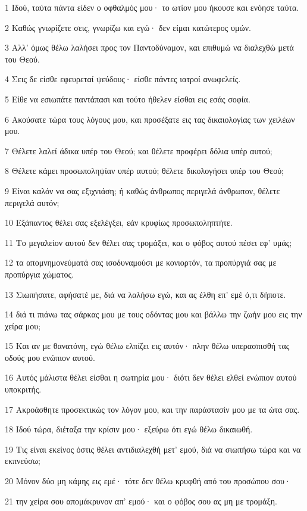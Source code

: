 \par 1 Ιδού, ταύτα πάντα είδεν ο οφθαλμός μου· το ωτίον μου ήκουσε και ενόησε ταύτα.
\par 2 Καθώς γνωρίζετε σεις, γνωρίζω και εγώ· δεν είμαι κατώτερος υμών.
\par 3 Αλλ' όμως θέλω λαλήσει προς τον Παντοδύναμον, και επιθυμώ να διαλεχθώ μετά του Θεού.
\par 4 Σεις δε είσθε εφευρεταί ψεύδους· είσθε πάντες ιατροί ανωφελείς.
\par 5 Είθε να εσιωπάτε παντάπασι και τούτο ήθελεν είσθαι εις εσάς σοφία.
\par 6 Ακούσατε τώρα τους λόγους μου, και προσέξατε εις τας δικαιολογίας των χειλέων μου.
\par 7 Θέλετε λαλεί άδικα υπέρ του Θεού; και θέλετε προφέρει δόλια υπέρ αυτού;
\par 8 Θέλετε κάμει προσωποληψίαν υπέρ αυτού; θέλετε δικολογήσει υπέρ του Θεού;
\par 9 Είναι καλόν να σας εξιχνιάση; ή καθώς άνθρωπος περιγελά άνθρωπον, θέλετε περιγελά αυτόν;
\par 10 Εξάπαντος θέλει σας εξελέγξει, εάν κρυφίως προσωποληπτήτε.
\par 11 Το μεγαλείον αυτού δεν θέλει σας τρομάξει, και ο φόβος αυτού πέσει εφ' υμάς;
\par 12 τα απομνημονεύματά σας ισοδυναμούσι με κονιορτόν, τα προπύργιά σας με προπύργια χώματος.
\par 13 Σιωπήσατε, αφήσατέ με, διά να λαλήσω εγώ, και ας έλθη επ' εμέ ό,τι δήποτε.
\par 14 διά τι πιάνω τας σάρκας μου με τους οδόντας μου και βάλλω την ζωήν μου εις την χείρα μου;
\par 15 Και αν με θανατόνη, εγώ θέλω ελπίζει εις αυτόν· πλην θέλω υπερασπισθή τας οδούς μου ενώπιον αυτού.
\par 16 Αυτός μάλιστα θέλει είσθαι η σωτηρία μου· διότι δεν θέλει ελθεί ενώπιον αυτού υποκριτής.
\par 17 Ακροάσθητε προσεκτικώς τον λόγον μου, και την παράστασίν μου με τα ώτα σας.
\par 18 Ιδού τώρα, διέταξα την κρίσιν μου· εξεύρω ότι εγώ θέλω δικαιωθή.
\par 19 Τις είναι εκείνος όστις θέλει αντιδιαλεχθή μετ' εμού, διά να σιωπήσω τώρα και να εκπνεύσω;
\par 20 Μόνον δύο μη κάμης εις εμέ· τότε δεν θέλω κρυφθή από του προσώπου σου·
\par 21 την χείρα σου απομάκρυνον απ' εμού· και ο φόβος σου ας μη με τρομάξη.
